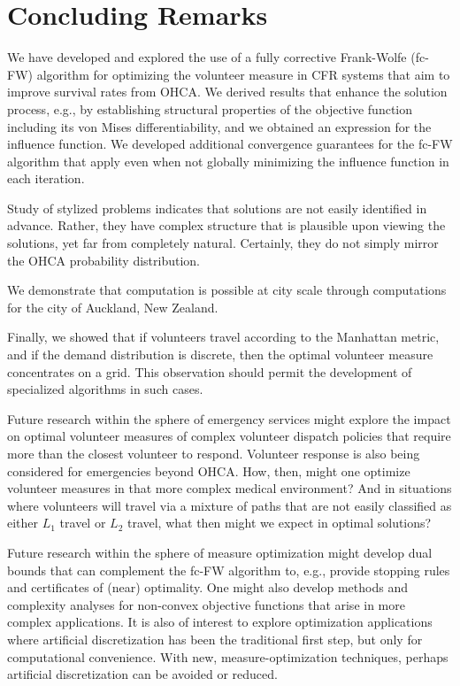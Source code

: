 \documentclass[stsy,sglanonrev]{informs4}
\begin{document}
\section{Concluding Remarks}\label{sec:concluding}
We have developed and explored the use of a fully corrective Frank-Wolfe (fc-FW) algorithm for optimizing the volunteer measure in CFR systems that aim to improve survival rates from OHCA. We derived results that enhance the solution process, e.g., by establishing structural properties of the objective function including its von Mises differentiability, and we obtained an expression for the influence function. We developed additional convergence guarantees for the fc-FW algorithm that apply even when not globally minimizing the influence function in each iteration.

Study of stylized problems indicates that solutions are not easily identified in advance. Rather, they have complex structure that is plausible upon viewing the solutions, yet far from completely natural. Certainly, they do not simply mirror the OHCA probability distribution.

We demonstrate that computation is possible at city scale through computations for the city of Auckland, New Zealand.

Finally, we showed that if volunteers travel according to the Manhattan metric, and if the demand distribution is discrete, then the optimal volunteer measure concentrates on a grid. This observation should permit the development of specialized algorithms in such cases.

Future research within the sphere of emergency services might explore the impact on optimal volunteer measures of complex volunteer dispatch policies that require more than the closest volunteer to respond. Volunteer response is also being considered for emergencies beyond OHCA. How, then, might one optimize volunteer measures in that more complex medical environment? And in situations where volunteers will travel via a mixture of paths that are not easily classified as either $L_1$ travel or $L_2$ travel, what then might we expect in optimal solutions?

Future research within the sphere of measure optimization might develop dual bounds that can complement the fc-FW algorithm to, e.g., provide stopping rules and certificates of (near) optimality. One might also develop methods and complexity analyses for non-convex objective functions that arise in more complex applications. It is also of interest to explore optimization applications where artificial discretization has been the traditional first step, but only for computational convenience. With new, measure-optimization techniques, perhaps artificial discretization can be avoided or reduced.
\end{document}
